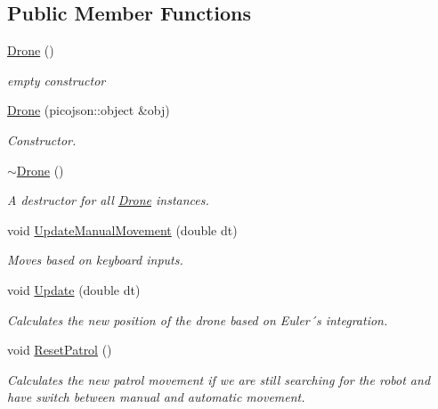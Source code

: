 \subsection*{Public Member Functions}
\begin{DoxyCompactItemize}
\item 
\mbox{\label{classDrone_ab692baa4be5c43b72990ce1b01bdc805}} 
\hyperlink{classDrone_ab692baa4be5c43b72990ce1b01bdc805}{Drone} ()
\begin{DoxyCompactList}\small\item\em empty constructor \end{DoxyCompactList}\item 
\hyperlink{classDrone_a4f426cef8328894a819cc31ba4b2bcdb}{Drone} (picojson\+::object \&obj)
\begin{DoxyCompactList}\small\item\em Constructor. \end{DoxyCompactList}\item 
\mbox{\label{classDrone_a667075abb1eb5c54be6418884a387d14}} 
\hyperlink{classDrone_a667075abb1eb5c54be6418884a387d14}{$\sim$\+Drone} ()
\begin{DoxyCompactList}\small\item\em A destructor for all \hyperlink{classDrone}{Drone} instances. \end{DoxyCompactList}\item 
void \hyperlink{classDrone_aabfc6155cd0b8e14ae77c4659c090185}{Update\+Manual\+Movement} (double dt)
\begin{DoxyCompactList}\small\item\em Moves based on keyboard inputs. \end{DoxyCompactList}\item 
void \hyperlink{classDrone_abc6b79ccc7fdbc3bec8d539fc836c04d}{Update} (double dt)
\begin{DoxyCompactList}\small\item\em Calculates the new position of the drone based on Euler´s integration. \end{DoxyCompactList}\item 
\mbox{\label{classDrone_a02b047f6ed0d4e95df1b3efb4a7ce9bc}} 
void \hyperlink{classDrone_a02b047f6ed0d4e95df1b3efb4a7ce9bc}{Reset\+Patrol} ()
\begin{DoxyCompactList}\small\item\em Calculates the new patrol movement if we are still searching for the robot and have switch between manual and automatic movement. \end{DoxyCompactList}\item 

\end{DoxyCompactItemize}

